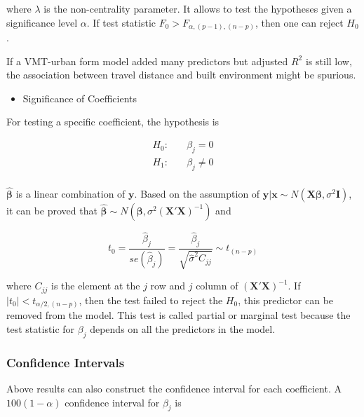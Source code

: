 \documentclass[
  11pt,
  openany]{memoir}
\providecommand{\tightlist}{%
  \setlength{\itemsep}{0pt}\setlength{\parskip}{0pt}}
\begin{document}
where \(\lambda\) is the non-centrality parameter. It allows to test the hypotheses given a significance level \(\alpha\). If test statistic \(F_0>F_{\alpha,(p-1),(n-p)}\), then one can reject \(H_0\).

If a VMT-urban form model added many predictors but adjusted \(R^2\) is still low, the association between travel distance and built environment might be spurious.

\begin{itemize}
\tightlist
\item
  Significance of Coefficients
\end{itemize}

For testing a specific coefficient, the hypothesis is

\begin{equation}
\begin{split}
H_0:&\quad \beta_j =0\\
H_1:&\quad \beta_j \neq 0\\
\end{split}
\label{eq:hyp-2}
\end{equation}

\(\boldsymbol{\hat\beta}\) is a linear combination of \(\mathbf{y}\). Based on the assumption of \(\mathbf{y|x}\sim N (\mathbf{X}\boldsymbol{\beta},\sigma^2\mathbf{I})\), it can be proved that \(\boldsymbol{\hat\beta}\sim N (\boldsymbol{\beta},\sigma^2(\mathbf{X'X})^{-1})\) and

\begin{equation}
t_0=\frac{\hat\beta_j}{se(\hat\beta_j)}=\frac{\hat\beta_j}{\sqrt{\hat\sigma^2C_{jj}}} \sim t_{(n-p)}
\end{equation}

where \(C_{jj}\) is the element at the \(j\) row and \(j\) column of \((\mathbf{X'X})^{-1}\). If \(|t_0|< t_{\alpha/2,(n-p)}\), then the test failed to reject the \(H_0\), this predictor can be removed from the model. This test is called partial or marginal test because the test statistic for \(\beta_j\) depends on all the predictors in the model.

\hypertarget{confidence-intervals}{%
\subsubsection{Confidence Intervals}\label{confidence-intervals}}

Above results can also construct the confidence interval for each coefficient. A \(100(1-\alpha)\) confidence interval for \(\beta_j\) is
\end{document}
